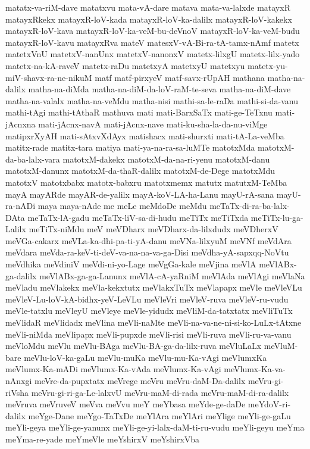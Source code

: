 {matatx-va-riM-dave
matatxvu
mata-vA-dare
matava
mata-va-lalxde
matayxR
matayxRkekx
matayxR-loV-kada
matayxR-loV-ka-dalilx
matayxR-loV-kakekx
matayxR-loV-kava
matayxR-loV-ka-veM-bu-deVnoV
matayxR-loV-ka-veM-budu
matayxR-loV-kavu
matayxRva
mateV
matesxV-vA-Bi-ra-tA-tamx-nAmf
matetx
matetxVnU
matetxV-nanUnx
matetxV-nanonxV
matetx-lilxgU
matetx-lilx-yado
matetx-na-kA-raveV
matetx-raDu
matetxyA
matetxyU
matetxyu
matetx-yu-miV-shavx-ra-ne-nikuM
matf
matf-pirxyeV
matf-savx-rUpAH
mathana
matha-na-dalilx
matha-na-diMda
matha-na-diM-da-loV-raM-te-seva
matha-na-diM-dave
matha-na-valalx
matha-na-veMdu
matha-nisi
mathi-sa-le-raDa
mathi-si-da-vanu
mathi-tAgi
mathi-tAthaR
mathuva
mati
mati-BarxSaTx
mati-ge-TeTxnu
mati-jAcnxna
mati-jAcnx-navA
mati-jAcnx-nave
mati-ku-sha-la-da-nu-viMge
matipxrXyAH
mati-sAtxvXdAyx
matishacx
mati-shurxti
mati-tA-La-veMba
matitx-rade
matitx-tara
matiya
mati-ya-na-ra-sa-luMTe
matotxMda
matotxM-da-ba-lalx-vara
matotxM-dakekx
matotxM-da-na-ri-yenu
matotxM-danu
matotxM-danunx
matotxM-da-thaR-dalilx
matotxM-de-Dege
matotxMdu
matotxV
matotxbabx
matotx-babxru
matotxmemx
matutx
matutxM-TeMba
mayA
mayARde
mayAR-de-yalilx
mayA-koV-LA-ha-Lanu
mayU-rA-sana
mayU-ra-nADi
maya
maya-nAde
me
meLe
meMdoDe
meMdu
meTaTx-di-ra-ba-lalx-DAta
meTaTx-lA-gadu
meTaTx-liV-sa-di-hudu
meTiTx
meTiTxda
meTiTx-lu-ga-Lalilx
meTiTx-niMdu
meV
meVDharx
meVDharx-da-lilxdudx
meVDherxV
meVGa-cakarx
meVLa-ka-dhi-pa-ti-yA-danu
meVNa-lilxyuM
meVNf
meVdAra
meVdara
meVda-ra-keV-ti-deV-va-na-na-va-ga-Disi
meVdha-yA-sapxqq-NoVtu
meVdhika
meVdiniV
meVdi-ni-yo-Lage
meVgGa-kale
meVjina
meVlA
meVlABx-ga-dalilx
meVlABx-ga-ga-Lanunx
meVlA-cA-yaRniM
meVlAda
meVlAgi
meVlaNa
meVladu
meVlakekx
meVla-kekxtutx
meVlakxTuTx
meVlapapx
meVle
meVleVLu
meVleV-Lu-loV-kA-bidhx-yeV-LeVLu
meVleVri
meVleV-ruva
meVleV-ru-vudu
meVle-tatxlu
meVleyU
meVleye
meVle-yidudx
meVliM-da-tatxtatx
meVliTuTx
meVlidaR
meVlidadx
meVlina
meVli-naMte
meVli-na-va-ne-ni-si-ko-LuLx-tAtxne
meVli-niMda
meVlipapx
meVli-pupxde
meVli-risi
meVli-ruva
meVli-ru-va-vanu
meVloMdu
meVlu
meVlu-BAga
meVlu-BA-ga-da-lilx-ruva
meVluLaLx
meVluM-bare
meVlu-loV-ka-gaLu
meVlu-muKa
meVlu-mu-Ka-vAgi
meVlumxKa
meVlumx-Ka-mADi
meVlumx-Ka-vAda
meVlumx-Ka-vAgi
meVlumx-Ka-va-nAnxgi
meVre-da-pupxtatx
meVrege
meVru
meVru-daM-Da-dalilx
meVru-gi-riVsha
meVru-gi-ri-ga-Le-lalxvU
meVru-maM-di-rada
meVru-maM-di-ra-dalilx
meVruva
meVruveV
meVva
meVvu
meY
meYbasa
meYde-ge-daDe
meYdoV-ri-dalilx
meYge-Dane
meYgo-TaTxDe
meYlAra
meYlAri
meYlige
meYli-ge-gaLu
meYli-geya
meYli-ge-yanunx
meYli-ge-yi-lalx-daM-ti-ru-vudu
meYli-geyu
meYma
meYma-re-yade
meYmeVle
meYshirxV
meYshirxVba
}
